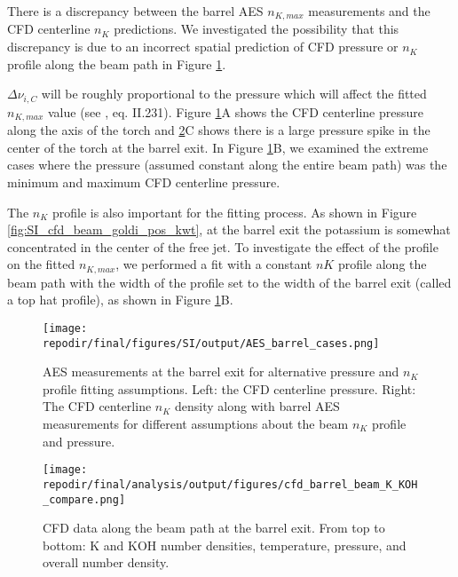 There is a discrepancy between the barrel AES $n_{K,max}$ measurements and the CFD centerline $n_{K}$ predictions. We investigated the possibility that this discrepancy is due to an incorrect spatial prediction of CFD pressure or $n_{K}$ profile along the beam path in Figure \ref{fig:SI_AES_barrel_cases}.  

$\Delta \nu_{i,C}$ will be roughly proportional to the pressure which will affect the fitted $n_{K,max}$ value (see \cite{alkemadeMetalVapoursFlames1982}, eq. II.231). Figure \ref{fig:SI_AES_barrel_cases}A shows the CFD centerline pressure along the axis of the torch and \ref{fig:SI_cfd_barrel_beam_K_KOH_compare}C shows there is a large pressure spike in the center of the torch at the barrel exit. In Figure \ref{fig:SI_AES_barrel_cases}B, we examined the extreme cases where the pressure (assumed constant along the entire beam path) was the minimum and maximum CFD centerline pressure. 

The $n_{K}$ profile is also important for the fitting process. As shown in Figure \ref{fig:SI_cfd_beam_goldi_pos_kwt}, at the barrel exit the potassium is somewhat concentrated in the center of the free jet. To investigate the effect of the profile on the fitted $n_{K,max}$, we performed a fit with a constant $n{K}$ profile along the beam path with the width of the profile set to the width of the barrel exit (called a top hat profile), as shown in Figure \ref{fig:SI_AES_barrel_cases}B.


\begin{figure}[]
    \centering
    \texttt{[image: \\repodir/final/figures/SI/output/AES\_barrel\_cases.png]}
    \caption{AES measurements at the barrel exit for alternative pressure and $n_{K}$ profile fitting assumptions. Left: the CFD centerline pressure. Right: The CFD centerline $n_{K}$ density along with barrel AES measurements for different assumptions about the beam $n_{K}$ profile and pressure. }
    \label{fig:SI_AES_barrel_cases}
\end{figure}


\begin{figure}[]
    \centering
    \texttt{[image: \\repodir/final/analysis/output/figures/cfd\_barrel\_beam\_K\_KOH\_compare.png]}
    \caption{CFD data along the beam path at the barrel exit. From top to bottom: K and KOH number densities, temperature, pressure, and overall number density. }
    \label{fig:SI_cfd_barrel_beam_K_KOH_compare}
\end{figure}



